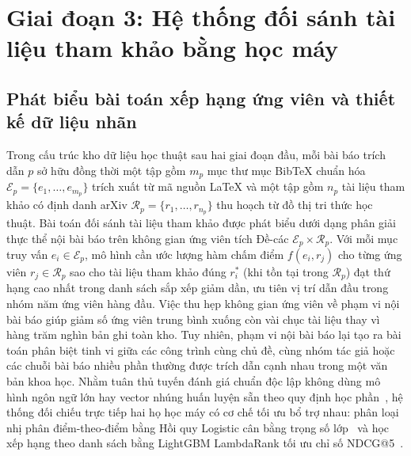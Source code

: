 \section{Giai đoạn 3: Hệ thống đối sánh tài liệu tham khảo bằng học máy}

\subsection{Phát biểu bài toán xếp hạng ứng viên và thiết kế dữ liệu nhãn}

Trong cấu trúc kho dữ liệu học thuật sau hai giai đoạn đầu, mỗi bài báo trích dẫn $p$ sở hữu đồng thời một tập gồm $m_p$ mục thư mục BibTeX chuẩn hóa $\mathcal{E}_p = \{e_1, \dots, e_{m_p}\}$ trích xuất từ mã nguồn LaTeX và một tập gồm $n_p$ tài liệu tham khảo có định danh arXiv $\mathcal{R}_p = \{r_1, \dots, r_{n_p}\}$ thu hoạch từ đồ thị tri thức học thuật. Bài toán đối sánh tài liệu tham khảo được phát biểu dưới dạng phân giải thực thể nội bài báo trên không gian ứng viên tích Đề-các $\mathcal{E}_p \times \mathcal{R}_p$. Với mỗi mục truy vấn $e_i \in \mathcal{E}_p$, mô hình cần ước lượng hàm chấm điểm $f(e_i, r_j)$ cho từng ứng viên $r_j \in \mathcal{R}_p$ sao cho tài liệu tham khảo đúng $r^*_i$ (khi tồn tại trong $\mathcal{R}_p$) đạt thứ hạng cao nhất trong danh sách sắp xếp giảm dần, ưu tiên vị trí dẫn đầu trong nhóm năm ứng viên hàng đầu. Việc thu hẹp không gian ứng viên về phạm vi nội bài báo giúp giảm số ứng viên trung bình xuống còn vài chục tài liệu thay vì hàng trăm nghìn bản ghi toàn kho. Tuy nhiên, phạm vi nội bài báo lại tạo ra bài toán phân biệt tinh vi giữa các công trình cùng chủ đề, cùng nhóm tác giả hoặc các chuỗi bài báo nhiều phần thường được trích dẫn cạnh nhau trong một văn bản khoa học. Nhằm tuân thủ tuyến đánh giá chuẩn độc lập không dùng mô hình ngôn ngữ lớn hay vector nhúng huấn luyện sẵn theo quy định học phần~\cite{hcmus_intro_ds}, hệ thống đối chiếu trực tiếp hai họ học máy có cơ chế tối ưu bổ trợ nhau: phân loại nhị phân điểm-theo-điểm bằng Hồi quy Logistic cân bằng trọng số lớp~\cite{pedregosa2011} và học xếp hạng theo danh sách bằng LightGBM LambdaRank tối ưu chỉ số NDCG@5~\cite{ke2017,burges2010}.

